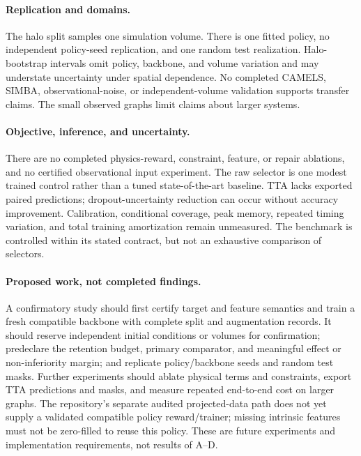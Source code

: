 \paragraph{Replication and domains.}
The halo split samples one simulation volume. There is one fitted policy, no independent policy-seed replication, and one random test realization. Halo-bootstrap intervals omit policy, backbone, and volume variation and may understate uncertainty under spatial dependence. No completed CAMELS, SIMBA, observational-noise, or independent-volume validation supports transfer claims. The small observed graphs limit claims about larger systems.

\paragraph{Objective, inference, and uncertainty.}
There are no completed physics-reward, constraint, feature, or repair ablations, and no certified observational input experiment. The raw selector is one modest trained control rather than a tuned state-of-the-art baseline. TTA lacks exported paired predictions; dropout-uncertainty reduction can occur without accuracy improvement. Calibration, conditional coverage, peak memory, repeated timing variation, and total training amortization remain unmeasured. The benchmark is controlled within its stated contract, but not an exhaustive comparison of selectors.

\paragraph{Proposed work, not completed findings.}
A confirmatory study should first certify target and feature semantics and train a fresh compatible backbone with complete split and augmentation records. It should reserve independent initial conditions or volumes for confirmation; predeclare the retention budget, primary comparator, and meaningful effect or non-inferiority margin; and replicate policy/backbone seeds and random test masks. Further experiments should ablate physical terms and constraints, export TTA predictions and masks, and measure repeated end-to-end cost on larger graphs. The repository's separate audited projected-data path does not yet supply a validated compatible policy reward/trainer; missing intrinsic features must not be zero-filled to reuse this policy. These are future experiments and implementation requirements, not results of A--D.
